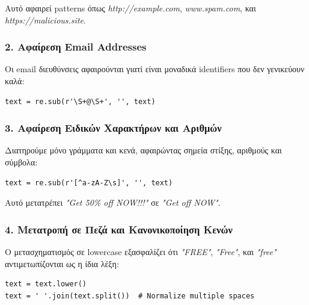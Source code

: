 \documentclass[12pt,a4paper,twoside]{book}
\begin{document}
Αυτό αφαιρεί patterns όπως \textit{http://example.com}, \textit{www.spam.com}, και \textit{https://malicious.site}.

\subsubsection*{2. Αφαίρεση Email Addresses}

Οι email διευθύνσεις αφαιρούνται γιατί είναι μοναδικά identifiers που δεν γενικεύουν καλά:

\begin{tcolorbox}[myCustomStyle={Email Addresses Removal}]
    \begin{lstlisting}[style=myPythonStyle]
text = re.sub(r'\S+@\S+', '', text)
\end{lstlisting}
\end{tcolorbox}

\subsubsection*{3. Αφαίρεση Ειδικών Χαρακτήρων και Αριθμών}

Διατηρούμε μόνο γράμματα και κενά, αφαιρώντας σημεία στίξης, αριθμούς και σύμβολα:

\begin{tcolorbox}[myCustomStyle={Special Characters Removal}]
    \begin{lstlisting}[style=myPythonStyle]
text = re.sub(r'[^a-zA-Z\s]', '', text)
\end{lstlisting}
\end{tcolorbox}

Αυτό μετατρέπει \textit{"Get 50\% off NOW!!!"} σε \textit{"Get off NOW"}.

\subsubsection*{4. Μετατροπή σε Πεζά και Κανονικοποίηση Κενών}

Ο μετασχηματισμός σε lowercase εξασφαλίζει ότι \textit{"FREE"}, \textit{"Free"}, και \textit{"free"} αντιμετωπίζονται ως η ίδια λέξη:

\begin{tcolorbox}[myCustomStyle={Lowercase Conversion}]
    \begin{lstlisting}[style=myPythonStyle]
text = text.lower()
text = ' '.join(text.split())  # Normalize multiple spaces
\end{lstlisting}
\end{tcolorbox}
\end{document}
